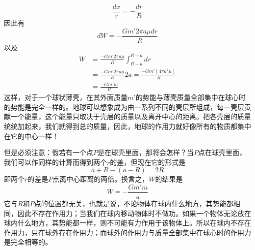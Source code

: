 \begin{equation*}
    \frac{dx}{r}=-\frac{dr}{R}
\end{equation*}
因此有
\begin{equation*}
    dW=-\frac{Gm'2 \pi a \mu dr}{R}
\end{equation*}
以及
\begin{equation}
    \label{Eq:I:13:18}
    \begin{aligned}
        W&=\frac{-Gm'2\pi a \mu}{R} \int_{R-a}^{R+a} dr \\
        &=\frac{-Gm'2\pi a \mu}{R}2a=\frac{-Gm'(4 \pi a^2 \mu)}{R} \\
        &=\frac{-Gm'm}{R}
    \end{aligned}
\end{equation}
这样，对于一个球状薄壳，在其外面质量$m'$的势能与薄壳质量全部集中在球心时的势能是完全一样的。地球可以想象成为由一系列不同的壳层所组成，每一壳层贡献一个能量，这个能量只取决于壳层的质量以及离开中心的距离。把各壳层的质量统统加起来，我们就得到总的质量，因此，地球的作用力就好像所有的物质都集中在它的中心一样！

但是必须注意：假若有一个点$P$是在球壳里面，那将会怎样？当$P$点在球壳里面，我们可以作同样的计算而得到两个$r$的差，但现在它的形式是
\begin{equation*}
    a+R-(a-R)=2R
\end{equation*}
即两个$r$的差是$P$点离中心距离的两倍。换言之，$W$的结果是
\begin{equation*}
    W=-\frac{Gm'm}{a}
\end{equation*}
它与$R$和$P$点的位置都无关，也就是说，不论物体在球内什么地方，其势能都相同，因此不存在作用力；当我们在球内移动物体时不做功。如果一个物体无论放在球内什么地方，其势能都一样，则不可能有力作用于该物体上。所以在球内不存在作用力，只在球外存在作用力；而球外的作用力与质量全部集中在球心时的作用力是完全相等的。